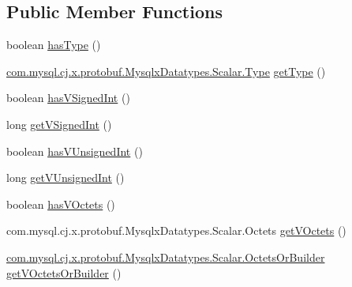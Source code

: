 \subsection*{Public Member Functions}
\begin{DoxyCompactItemize}
\item 
boolean \mbox{\hyperlink{interfacecom_1_1mysql_1_1cj_1_1x_1_1protobuf_1_1_mysqlx_datatypes_1_1_scalar_or_builder_a6f8718df248452ea2d4f8a47fc103fc1}{has\+Type}} ()
\item 
\mbox{\hyperlink{enumcom_1_1mysql_1_1cj_1_1x_1_1protobuf_1_1_mysqlx_datatypes_1_1_scalar_1_1_type}{com.\+mysql.\+cj.\+x.\+protobuf.\+Mysqlx\+Datatypes.\+Scalar.\+Type}} \mbox{\hyperlink{interfacecom_1_1mysql_1_1cj_1_1x_1_1protobuf_1_1_mysqlx_datatypes_1_1_scalar_or_builder_ae28ed54779317bfc352e581e1457c16e}{get\+Type}} ()
\item 
boolean \mbox{\hyperlink{interfacecom_1_1mysql_1_1cj_1_1x_1_1protobuf_1_1_mysqlx_datatypes_1_1_scalar_or_builder_a9e97c60513af95a6337a2dfb4b0ebaa7}{has\+V\+Signed\+Int}} ()
\item 
long \mbox{\hyperlink{interfacecom_1_1mysql_1_1cj_1_1x_1_1protobuf_1_1_mysqlx_datatypes_1_1_scalar_or_builder_ac0634b6eced7c2931f42a374ea2977d9}{get\+V\+Signed\+Int}} ()
\item 
boolean \mbox{\hyperlink{interfacecom_1_1mysql_1_1cj_1_1x_1_1protobuf_1_1_mysqlx_datatypes_1_1_scalar_or_builder_a90769b1f811e80e2769df5e7c6b87221}{has\+V\+Unsigned\+Int}} ()
\item 
long \mbox{\hyperlink{interfacecom_1_1mysql_1_1cj_1_1x_1_1protobuf_1_1_mysqlx_datatypes_1_1_scalar_or_builder_a477e0e03de799dd337f146f0a0fd95e3}{get\+V\+Unsigned\+Int}} ()
\item 
boolean \mbox{\hyperlink{interfacecom_1_1mysql_1_1cj_1_1x_1_1protobuf_1_1_mysqlx_datatypes_1_1_scalar_or_builder_a440d53814ace8d2ad2b8fb2431a32828}{has\+V\+Octets}} ()
\item 
com.\+mysql.\+cj.\+x.\+protobuf.\+Mysqlx\+Datatypes.\+Scalar.\+Octets \mbox{\hyperlink{interfacecom_1_1mysql_1_1cj_1_1x_1_1protobuf_1_1_mysqlx_datatypes_1_1_scalar_or_builder_ab6d12c53be99ebfbc5549275ef62c8ca}{get\+V\+Octets}} ()
\item 
\mbox{\hyperlink{interfacecom_1_1mysql_1_1cj_1_1x_1_1protobuf_1_1_mysqlx_datatypes_1_1_scalar_1_1_octets_or_builder}{com.\+mysql.\+cj.\+x.\+protobuf.\+Mysqlx\+Datatypes.\+Scalar.\+Octets\+Or\+Builder}} \mbox{\hyperlink{interfacecom_1_1mysql_1_1cj_1_1x_1_1protobuf_1_1_mysqlx_datatypes_1_1_scalar_or_builder_af76f9a2f8709bfa5f9ed665f1f2075b9}{get\+V\+Octets\+Or\+Builder}} ()

\end{DoxyCompactItemize}
